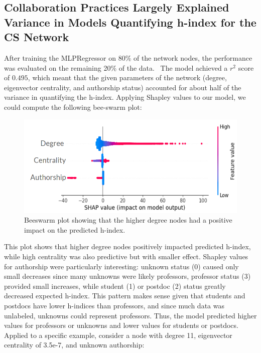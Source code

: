 \documentclass[9pt,twocolumn,twoside]{pnas-new}
\begin{document}
\subsection*{Collaboration Practices Largely Explained Variance in Models Quantifying h-index for the CS Network} 
After training the MLPRegressor on 80\% of the network nodes, the performance was evaluated on the remaining 20\% of the data.  The model achieved a $r^2$ score of $0.495$, which meant that the given parameters of the network (degree, eigenvector centrality, and authorship status) accounted for about half of the variance in quantifying the h-index. Applying Shapley values to our model, we could compute the following bee-swarm plot:
\begin{figure}[H]
    \centering
        \includegraphics[width=0.35\textheight]{beeswarm.png}
    \caption{Beeswarm plot showing that the higher degree nodes had a positive impact on the predicted h-index. }
    \label{fig:beeswarm}
\end{figure}
\noindent 
This plot shows that higher degree nodes positively impacted predicted h-index, while high centrality was also predictive but with smaller effect. Shapley values for authorship were particularly interesting: unknown status (0) caused only small decreases since many unknowns were likely professors, professor status (3) provided small increases, while student (1) or postdoc (2) status greatly decreased expected h-index. This pattern makes sense given that students and postdocs have lower h-indices than professors, and since much data was unlabeled, unknowns could represent professors. Thus, the model predicted higher values for professors or unknowns and lower values for students or postdocs. Applied to a specific example, consider a node with degree 11, eigenvector centrality of 3.5e-7, and unknown authorship:
\end{document}
